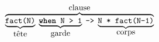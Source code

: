\documentclass[10pt]{article}
\newcommand\erlcode[1]{\texttt{#1}}
\begin{document}
\thispagestyle{empty}
\[
\overbrace{\underbrace{\erlcode{fact(N)}}_{\textrm{\normalsize tête}} \; \underbrace{\erlcode{\textbf{when} N > 1}}_{\textrm{\normalsize garde}} \; \erlcode{->} \; \underbrace{\erlcode{N * fact(N-1)}}_{\textrm{\normalsize corps}}}^{\textrm{\normalsize clause}}
\]
\end{document}
